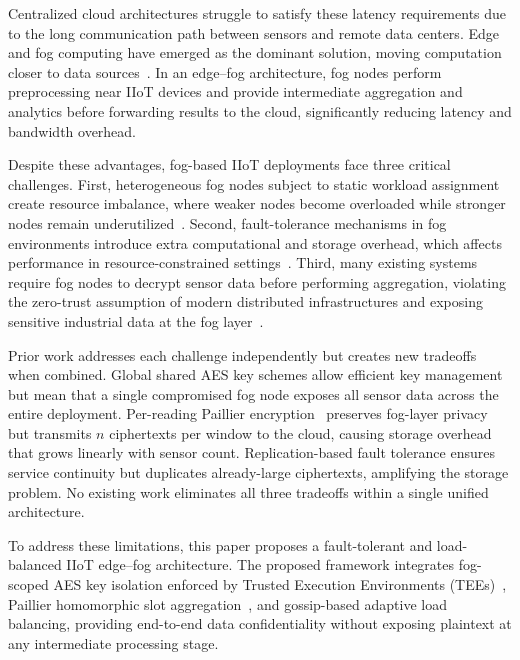 \documentclass[conference]{IEEEtran}
\begin{document}
    Centralized cloud architectures struggle to satisfy these latency 
    requirements due to the long communication path between sensors and 
    remote data centers. Edge and fog computing have emerged as the 
    dominant solution, moving computation closer to data 
    sources~\cite{jin2024}. In an edge--fog architecture, fog nodes
    perform preprocessing near IIoT devices and provide intermediate
    aggregation and analytics before forwarding results to the cloud,
    significantly reducing latency and bandwidth overhead.

    Despite these advantages, fog-based IIoT deployments face three 
    critical challenges. First, heterogeneous fog nodes subject to static 
    workload assignment create resource imbalance, where weaker nodes 
    become overloaded while stronger nodes remain 
    underutilized~\cite{kashani2023}. Second, fault-tolerance mechanisms in fog environments introduce extra computational and storage overhead, which affects performance in resource-constrained settings~\cite{chen2024lb}. Third, many 
    existing systems require fog nodes to decrypt sensor data before 
    performing aggregation, violating the zero-trust assumption of modern 
    distributed infrastructures and exposing sensitive industrial data at 
    the fog layer~\cite{mirani2022}.

    Prior work addresses each challenge independently but creates new 
    tradeoffs when combined. Global shared AES key schemes allow 
    efficient key management but mean that a single compromised fog node 
    exposes all sensor data across the entire deployment. Per-reading 
    Paillier encryption~\cite{peng2022} preserves fog-layer privacy but 
    transmits $n$ ciphertexts per window to the cloud, causing storage 
    overhead that grows linearly with sensor count. Replication-based 
    fault tolerance ensures service continuity but duplicates 
    already-large ciphertexts, amplifying the storage problem. No 
    existing work eliminates all three tradeoffs within a single unified 
    architecture.

    To address these limitations, this paper proposes a fault-tolerant
    and load-balanced IIoT edge--fog architecture. The proposed framework
    integrates fog-scoped AES key isolation enforced by Trusted Execution
    Environments (TEEs)~\cite{costan2016}, Paillier homomorphic slot
    aggregation~\cite{paillier1999}, and gossip-based adaptive load
    balancing, providing end-to-end data confidentiality without exposing
    plaintext at any intermediate processing stage.
\end{document}
